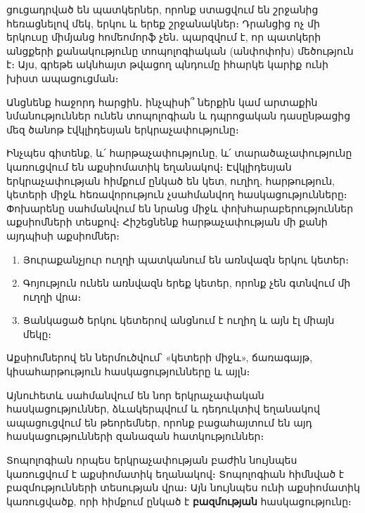 \documentclass[./main.tex]{subfiles}
\begin{document}
ցուցադրված են պատկերներ, որոնք ստացվում են շրջանից հեռացնելով մեկ, երկու և երեք շրջանակներ։ Դրանցից ոչ մի երկուսը միմյանց հոմեոմորֆ չեն․ պարզվում է, որ պատկերի անցքերի քանակությունը տոպոլոգիական (անփոփոխ) մեծություն է։ Այս, գրեթե ակնհայտ թվացող պնդումը իհարկե կարիք ունի խիստ ապացուցման։
\par Անցնենք հաջորդ հարցին․ ինչպիսի՞ ներքին կամ արտաքին նմանություններ ունեն տոպոլոգիան և դպրոցական դասընթացից մեզ ծանոթ էվկլիդեսյան երկրաչափությունը։
\par Ինչպես գիտենք, և՛ հարթաչափությունը, և՛ տարածաչափությունը կառուցվում են աքսիոմատիկ եղանակով։ Էվկլիդեսյան երկրաչափության հիմքում ընկած են կետ, ուղիղ, հարթություն, կետերի միջև հեռավորություն չսահմանվող հասկացությունները։ Փոխարենը սահմանվում են նրանց միջև փոխհարաբերություններ աքսիոմների տեսքով։ Հիշեցնենք հարթաչափության մի քանի այդպիսի աքսիոմներ։
\begin{enumerate}
\item Յուրաքանչյուր ուղղի պատկանում են առնվազն երկու կետեր։

\item Գոյություն ունեն առնվազն երեք կետեր, որոնք չեն գտնվում մի ուղղի վրա։

\item Ցանկացած երկու կետերով անցնում է ուղիղ և այն էլ միայն մեկը։
\end{enumerate}
Աքսիոմներով են ներմուծվում՝ «կետերի միջև», ճառագայթ, կիսահարթություն հասկացությունները և այլն։
 \par Այնուհետև սահմանվում են նոր երկրաչափական հասկացություններ, ձևակերպվում և դեդուկտիվ եղանակով ապացուցվում են թեորեմներ, որոնք բացահայտում են այդ հասկացությունների զանազան հատկություններ։ 
\par Տոպոլոգիան որպես երկրաչափության բաժին նույնպես կառուցվում է աքսիոմատիկ եղանակով։ Տոպոլոգիան հիմնված է բազմությունների տեսության վրա։ Այն նույնպես ունի աքսիոմատիկ կառուցվածք, որի հիմքում ընկած է \textbf{բազմության} հասկացությունը։
\end{document}
